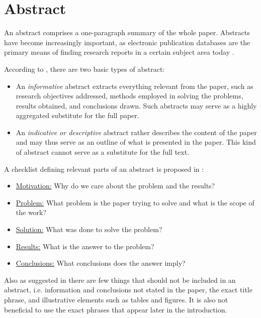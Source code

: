 \chapter*{Abstract}
\thispagestyle{empty}
An abstract comprises a one-paragraph summary of the whole paper.
Abstracts have become increasingly important, as electronic publication databases
are the primary means of finding research reports in a certain subject area
today \cite{Koopman1997}.

According to \cite{Day2012}, there are two basic types of abstract:
\begin{itemize}
  \item An \textit{informative} abstract extracts everything relevant from the
  paper, such as research objectives addressed, methods employed in solving the problems,
results obtained, and conclusions drawn. Such abstracts may serve as a highly
aggregated substitute for the full paper.
\item An \textit{indicative or descriptive} abstract rather describes the
content of the paper and may thus serve as an outline of what is presented in
the paper. This kind of abstract cannot serve as a substitute for the full text.
\end{itemize}
A checklist defining relevant parts of an abstract is proposed in
\cite{Koopman1997}:
\begin{itemize}
\item \uline{Motivation:} Why do we care about the problem and the results?
\item \uline{Problem:} What problem is the paper trying to solve and what is
the scope of the work?
\item \uline{Solution:} What was done to solve the problem?
\item \uline{Results:} What is the answer to the problem?
\item \uline{Conclusions:} What conclusions does the answer imply?
\end{itemize}
Also as suggested in \cite{Day2012} there are few things that should not be
included in an abstract, i.e. information and conclusions not stated in the
paper, the exact title phrase, and illustrative elements such as tables and figures.  It is also
not beneficial to use the exact phrases that appear later in the introduction.